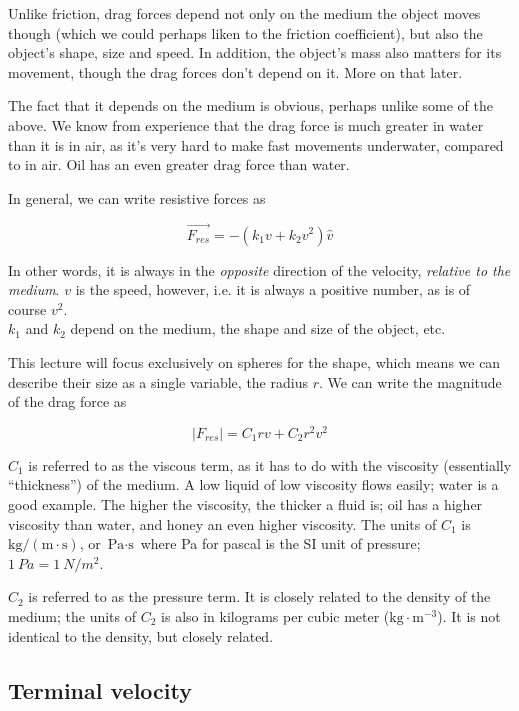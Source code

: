 Unlike friction, drag forces depend not only on the medium the object moves though (which we could perhaps liken to the friction coefficient), but also the object's shape, size and speed. In addition, the object's mass also matters for its movement, though the drag forces don't depend on it. More on that later.

The fact that it depends on the medium is obvious, perhaps unlike some of the above. We know from experience that the drag force is much greater in water than it is in air, as it's very hard to make fast movements underwater, compared to in air. Oil has an even greater drag force than water.

In general, we can write resistive forces as

\begin{equation}
\vec{F_{res}} = -\left( k_1 v + k_2 v^2 \right) \hat{v}
\end{equation}

In other words, it is always in the \emph{opposite} direction of the velocity, \emph{relative to the medium}. $v$ is the speed, however, i.e. it is always a positive number, as is of course $v^2$.\\
$k_1$ and $k_2$ depend on the medium, the shape and size of the object, etc.

This lecture will focus exclusively on spheres for the shape, which means we can describe their size as a single variable, the radius $r$. We can write the magnitude of the drag force as

\begin{equation}
|F_{res}| = C_1 r v + C_2 r^2 v^2
\end{equation}

$C_1$ is referred to as the viscous term, as it has to do with the viscosity (essentially ``thickness'') of the medium. A low liquid of low viscosity flows easily; water is a good example. The higher the viscosity, the thicker a fluid is; oil has a higher viscosity than water, and honey an even higher viscosity. The units of $C_1$ is $\text{kg}/(\text{m} \cdot \text{s})$, or $\text{Pa} \cdot \text{s}$ where Pa for pascal is the SI unit of pressure; $\SI{1}{Pa} = \SI{1}{N/m^2}$.

$C_2$ is referred to as the pressure term. It is closely related to the density of the medium; the units of $C_2$ is also in kilograms per cubic meter ($\text{kg} \cdot \text{m}^{-3}$). It is not identical to the density, but closely related.

\subsection{Terminal velocity}

